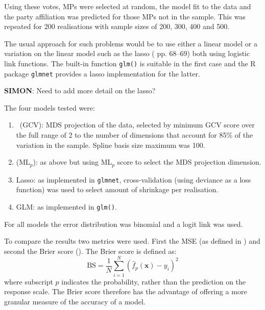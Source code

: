 Using these votes, MPs were selected at random, the model fit to the data and the party affiliation was predicted for those MPs not in the sample. This was repeated for 200 realisations with sample sizes of 200, 300, 400 and 500.

The usual approach for such problems would be to use either a linear model or a variation on the linear model such as the lasso (\cite{elements} pp. 68--69) both using logistic link functions. The built-in function \texttt{glm()} is suitable in the first case and the \textsf{R} package \texttt{glmnet} provides a lasso implementation for the latter.

\textbf{SIMON}: Need to add more detail on the lasso?

The four models tested were:
\begin{enumerate}
	\item \mdsds\ (GCV): MDS projection of the data, selected by minimum GCV score over the full range of 2 to the number of dimensions that account for 85\% of the variation in the sample. Spline basis size maximum was 100.
	\item \mdsds\: ($\text{ML}_p$): as above but using $\text{ML}_p$ score to select the MDS projection dimension.
	\item Lasso: as implemented in \texttt{glmnet}, cross-validation (using deviance as a loss function) was used to select amount of shrinkage per realisation.
	\item GLM: as implemented in \texttt{glm()}.
\end{enumerate}
For all models the error distribution was binomial and a logit link was used.

To compare the results two metrics were used. First the MSE (as defined in ) and second the Brier score (\cite{brier50}). The Brier score is defined as:
\begin{equation}
\text{BS} = \frac{1}{N} \sum_{i=1}^N (\hat{f}_p(\mathbf{x})-y_i)^2
\end{equation}
where subscript $p$ indicates the probability, rather than the prediction on the response scale. The Brier score therefore has the advantage of offering a more granular measure of the accuracy of a model.

